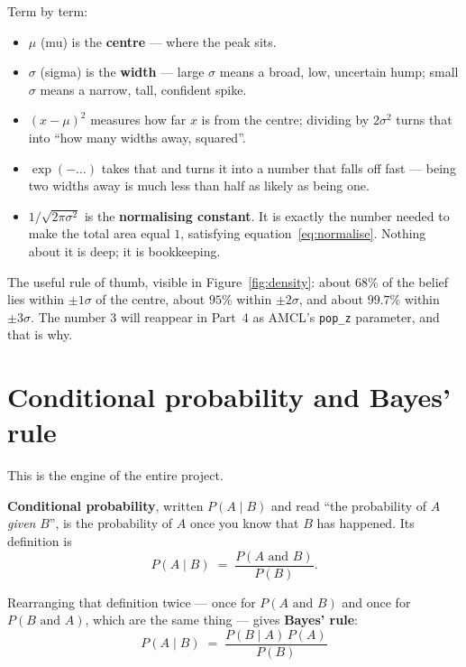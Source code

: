 \documentclass[11pt,a4paper]{report}
\newcommand{\term}[1]{\textcolor{rust}{\textbf{#1}}}
\newcommand{\file}[1]{\texttt{\small #1}}
\begin{document}
Term by term:
\begin{itemize}[leftmargin=1.4em,itemsep=2pt]
\item $\mu$ (mu) is the \textbf{centre} --- where the peak sits.
\item $\sigma$ (sigma) is the \textbf{width} --- large $\sigma$ means a broad,
low, uncertain hump; small $\sigma$ means a narrow, tall, confident spike.
\item $(x-\mu)^2$ measures how far $x$ is from the centre; dividing by
$2\sigma^2$ turns that into ``how many widths away, squared''.
\item $\exp(-\ldots)$ takes that and turns it into a number that falls off
fast --- being two widths away is much less than half as likely as being one.
\item $1/\sqrt{2\pi\sigma^2}$ is the \textbf{normalising constant}. It is
exactly the number needed to make the total area equal $1$, satisfying
equation~\eqref{eq:normalise}. Nothing about it is deep; it is bookkeeping.
\end{itemize}

The useful rule of thumb, visible in Figure~\ref{fig:density}: about $68\%$ of
the belief lies within $\pm 1\sigma$ of the centre, about $95\%$ within
$\pm 2\sigma$, and about $99.7\%$ within $\pm 3\sigma$. The number $3$ will
reappear in Part~4 as AMCL's \file{pop\_z} parameter, and that is why.

\section{Conditional probability and Bayes' rule}

This is the engine of the entire project.

\term{Conditional probability}, written $P(A \mid B)$ and read ``the
probability of $A$ \emph{given} $B$'', is the probability of $A$ once you know
that $B$ has happened. Its definition is
\[
P(A \mid B) \;=\; \frac{P(A \text{ and } B)}{P(B)} .
\]

Rearranging that definition twice --- once for $P(A\text{ and }B)$ and once for
$P(B\text{ and }A)$, which are the same thing --- gives \term{Bayes' rule}:
\begin{equation}
\boxed{\;
P(A \mid B) \;=\; \frac{P(B \mid A)\, P(A)}{P(B)}
\;}
\label{eq:bayes}
\end{equation}
\end{document}
